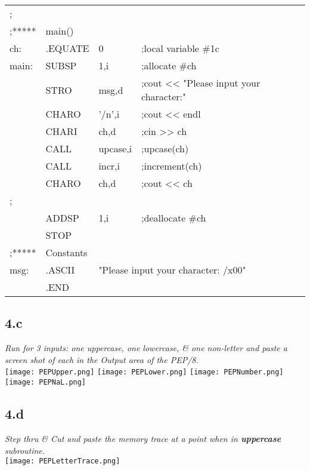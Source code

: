 \documentclass[a4paper,man,natbib]{apa6}
\begin{document}
\begin{tabular}{l l l l}
; &&&\\
;***** &main() &&\\
ch: & .EQUATE&0          &;local variable \#1c \\
main:& SUBSP &1,i        &;allocate \#ch \\
	&STRO    &msg,d      &;cout << "Please input your character:" \\
	&CHARO   &'$\slash$n',i &;cout << endl \\
	&CHARI   &ch,d       &;cin >> ch \\
	&CALL    &upcase,i   &;upcase(ch) \\
	&CALL    &incr,i     &;increment(ch) \\
	&CHARO   &ch,d       &;cout << ch \\
; &&&\\
	& ADDSP   &1,i         &;deallocate \#ch \\
	& STOP &&\\
;*****&\multicolumn{2}{l}{Constants}&\\
msg:   &.ASCII&\multicolumn{2}{l}{"Please input your character: $\slash$x00"}\\
	&.END	&& \\
	\end{tabular}
\subsection{4.c}
\emph{Run for 3 inputs: one uppercase, one lowercase, \& one non-letter and paste a screen shot of each in the Output area of the PEP/8.} \\
\noindent
\texttt{[image: PEPUpper.png]}
\texttt{[image: PEPLower.png]}
\texttt{[image: PEPNumber.png]} 
\texttt{[image: PEPNaL.png]}
\subsection{4.d}
\emph{Step thru \& Cut and paste the memory trace at a point when in \textbf{uppercase} subroutine.} \\
\texttt{[image: PEPLetterTrace.png]}

\nocite{warford10}


\end{document}

